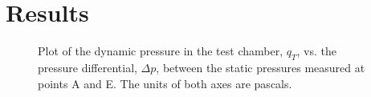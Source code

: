 \chapter{Results}
\label{cp:results}

\begin{figure}[htpb]
    \centering
    
    \caption[Plot of dynamic pressure vs. the pressure differential]{Plot of the dynamic pressure in the test chamber, $q_T$, vs. the pressure differential, $\Delta{}p$, between the static pressures measured at points A and E. The units of both axes are pascals.}
    \label{fig:dynamic_pressure_graph}
\end{figure}